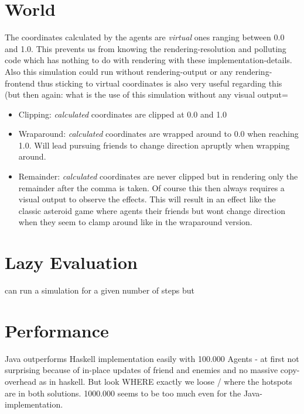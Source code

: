 \section{World}
The coordinates calculated by the agents are \textit{virtual} ones ranging between 0.0 and 1.0. This prevents us from knowing the rendering-resolution and polluting code which has nothing to do with rendering with these implementation-details. Also this simulation could run without rendering-output or any rendering-frontend thus sticking to virtual coordinates is also very useful regarding this (but then again: what is the use of this simulation without any visual output=

\begin{itemize}
\item Clipping: \textit{calculated} coordinates are clipped at 0.0 and 1.0 
\item Wraparound: \textit{calculated} coordinates are wrapped around to 0.0 when reaching 1.0. Will lead pursuing friends to change direction apruptly when wrapping around.
\item Remainder: \textit{calculated} coordinates are never clipped but in rendering only the remainder after the comma is taken. Of course this then always requires a visual output to observe the effects. This will result in an effect like the classic asteroid game where agents their friends but wont change direction when they seem to clamp around like in the wraparound version.
\end{itemize}

\section{Lazy Evaluation}
can run a simulation for a given number of steps but 

\section{Performance}
Java outperforms Haskell implementation easily with 100.000 Agents - at first not surprising because of in-place updates of friend and enemies and no massive copy-overhead as in haskell. But look WHERE exactly we loose / where the hotspots are in both solutions. 1000.000 seems to be too much even for the Java-implementation.

